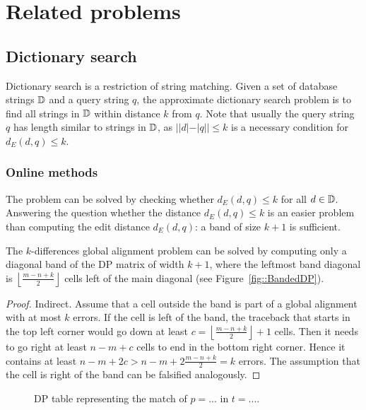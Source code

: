 \chapter{Related problems}

\section{Dictionary search}

Dictionary search is a restriction of string matching.
Given a set of database strings $\mathbb {D}$ and a query string $q$, the approximate dictionary search problem is to find all strings in $\mathbb {D}$ within distance $k$ from $q$.
Note that usually the query string $q$ has length similar to strings in $\mathbb {D}$, as $| |d| - |q| | \leq k$ is a necessary condition for $d_E(d,q) \leq k$.

\subsection{Online methods}

The problem can be solved by checking whether $d_E(d,q) \leq k$ for all $d \in \mathbb {D}$.
Answering the question whether the distance $d_E(d,q) \leq k$ is an easier problem than computing the edit distance $d_E(d,q)$: a band of size $k+1$ is sufficient.

\begin{lemma}
\label{lemma:kband}
The $k$-differences global alignment problem can be solved by computing only a diagonal band of the DP matrix of width $k+1$, where the leftmost band diagonal is $\left\lfloor\frac{m-n+k}{2}\right\rfloor$ cells left of the main diagonal (see Figure~\ref{fig::BandedDP}).
\end{lemma}
\begin{proof}
Indirect. Assume that a cell outside the band is part of a global alignment with at most $k$ errors.
If the cell is left of the band, the traceback that starts in the top left corner would go down at least $c=\left\lfloor\frac{m-n+k}{2}\right\rfloor+1$ cells. Then it needs to go right at least $n-m+c$ cells to end in the bottom right corner.
Hence it contains at least $n-m+2c>n-m+2\frac{m-n+k}{2}=k$ errors.
The assumption that the cell is right of the band can be falsified analogously.
\end{proof}

\begin{figure}[h]
\begin{center}
\caption[Example of $k$-differences global aligment via DP.]{DP table representing the match of $p=...$ in $t=...$.}
\label{fig:dict-dp}

\end{center}
\end{figure}


